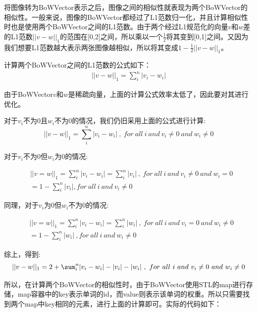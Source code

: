 将图像转为BoWVector表示之后，图像之间的相似性就表现为两个BoWVector的相似性。一般来说，图像的BoWVector都经过了L1范数归一化，并且计算相似性时也是使用两个BoWVector之间的L1范数。由于两个经过L1规范化的向量$v$和$w$差的L1范数$||v-w||_1$的范围在[0,2]之间，所以乘以一个$\frac{1}{2}$将其变到[0,1]之间。又因为我们想要L1范数越大表示两张图像越相似，所以将其变成$1 - \frac{1}{2}||v - w||_1$。

计算两个BoWVector之间的L1范数的公式如下：
\begin{eqnarray}
	||v - w||_1 = \sum_i^n |v_i - w_i|
\end{eqnarray}

由于BoWVector$v$和$w$是稀疏向量，上面的计算公式效率太低了，因此要对其进行优化。

对于$v_i$不为0且$w_i$不为0的情况，我们仍旧采用上面的公式进行计算:
\begin{equation}
	||v - w||_1 = \sum_i^n |v_i - w_i| \ , \ for \ all \ i \ and \ v_i \ne 0 \ and \ w_i \ne 0
\end{equation}


对于$v_i$不为0但$w_i$为0的情况:

\begin{equation}
\begin{split}
& ||v = w||_1  = \sum_i^n |v_i - w_i| = \sum_i^n |v_i| \ , \ for \ all \ i \ and \ v_i \ne 0 \ and \ w_i = 0 \\
& = 1 -  \sum_i^n |v_i|, for \ all \ i \ and \ v_i \ne 0 
\end{split}
\end{equation}


同理，对于$v_i$为0但$w_i$不为0的情况:

\begin{equation}
\begin{split}
& ||v = w||_1  = \sum_i^n |v_i - w_i| = \sum_i^n |w_i| \ ,\ for \ all \ i \ and \ v_i = 0 \ and \ w_i \ne 0 \\
& = 1 -  \sum_i^n |w_i| \ , for \ all \ i \ and \ w_i \ne 0 
\end{split}
\end{equation}

综上，得到:
\begin{equation}
	||v - w||_1 = 2 + \sum_i^n |v_i - w_i| -|v_i| - |w_i|  \ ,\ for \ all \ i \ and \ v_i \ne 0 \ and \ w_i \ne 0 \\
\end{equation}



所以，在计算两个BoWVector的相似性时，由于BoWVector使用STL的map进行存储，map容器中的key表示单词的id，而value则表示该单词的权重。所以只需要找到两个map中key相同的元素，进行上面的计算即可。实际的代码如下：


